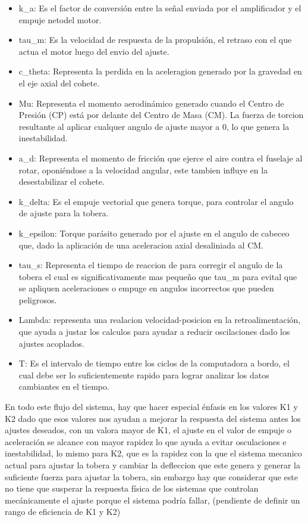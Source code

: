 \documentclass[article, 11pt]{IEEEtran}   %
\begin{document}
\begin{itemize}
\item k\_a: Es el factor de conversión entre la señal enviada por el amplificador y el empuje netodel motor.
\item tau\_m: Es la velocidad de respuesta de la propulsión, el retraso con el que actua el motor luego del envio del ajuste.
\item c\_theta: Representa la perdida en la aceleragion generado por la gravedad en el eje axial del cohete.
\item Mu: Representa el momento aerodinámico generado cuando el Centro de Presión (CP) está por delante del Centro de Masa (CM). La fuerza de torcion resultante al aplicar cualquer angulo de ajuste mayor a 0, lo que genera la inestabilidad.
\item a\_d: Representa el momento de fricción que ejerce el aire contra el fuselaje al rotar, oponiéndose a la velocidad angular, este tambien influye en la desestabilizar el cohete.
\item k\_delta: Es el empuje vectorial que genera torque, para controlar el angulo de ajuste para la tobera.
\item k\_epsilon: Torque parásito generado por el ajuste en el angulo de cabeceo que, dado la aplicación de una aceleracion axial desaliniada al CM.
\item tau\_s: Representa el tiempo de reaccion de para corregir el angulo de la tobera el cual es significativamente mas pequeño que tau\_m para evital que se apliquen aceleraciones o empuge en angulos incorrectos que pueden peligrosos.
\item Lambda: representa una realacion velocidad-posicion en la retroalimentación, que ayuda a justar los calculos para ayudar a reducir oscilaciones dado los ajustes acoplados.
\item T: Es el intervalo de tiempo entre los ciclos de la computadora a bordo, el cual debe ser lo suficientemente rapido para lograr analizar los datos cambiantes en el tiempo.
\end{itemize}
En todo este flujo del sistema, hay que hacer especial énfasis en los valores K1 y K2 dado que esos valores nos ayudan a mejorar la respuesta del sistema antes los ajustes deseados, con un valora mayor de K1, el ajuste en el valor de empuje o aceleración se alcance con mayor rapidez lo que ayuda a evitar osculaciones e inestabilidad, lo mismo para K2, que es la rapidez con la que el sistema mecanico actual para ajustar la tobera y cambiar la defleccion que este genera y generar la suficiente fuerza para ajustar la tobera, sin embargo hay que considerar que este no tiene que susperar la respuesta física de los sistemas que controlan mecánicamente el ajuste porque el sistema podría fallar, (pendiente de definir un rango de eficiencia de K1 y K2)
\end{document}
